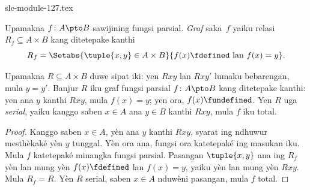 \begin{filecontents*}[overwrite]{slc-module-127.tex}
\begin{defn}
Upamakna $f\colon A \pto B$ sawijining fungsi parsial. \emph{Graf} saka~$f$
yaiku relasi $R_f \subseteq A \times B$ kang ditetepake kanthi
\[
R_f = \Setabs{\tuple{x,y} \in A \times B}{f(x) \fdefined \text{ lan } f(x) = y}.
\]
\end{defn}

\begin{prop}
Upamakna $R \subseteq A \times B$ duwe sipat iki: yen $Rxy$
lan $Rxy'$ lumaku bebarengan, mula $y = y'$. Banjur $R$ iku graf fungsi parsial
$f\colon A \pto B$ kang ditetepake kanthi: yen ana $y$ kanthi
$Rxy$, mula $f(x) = y$; yen ora, $f(x) \fundefined$. Yen $R$ uga
\emph{serial}, yaiku kanggo saben $x \in A$ ana $y \in B$ kanthi
$Rxy$, mula $f$ iku total.
\end{prop}

\begin{proof}
Kanggo saben $x \in A$, yèn ana $y$ kanthi $Rxy$, syarat ing ndhuwur
mesthèkaké yèn $y$ tunggal. Yèn ora ana, fungsi ora katetepaké ing masukan iku.
Mula $f$ katetepaké minangka fungsi parsial. Pasangan $\tuple{x,y}$ ana ing $R_f$ yèn lan mung yèn $f(x) \fdefined$ lan $f(x)=y$,
yaiku yèn lan mung yèn $Rxy$. Mula $R_f = R$.
Yèn $R$ serial, saben $x \in A$ nduwèni pasangan, mula $f$ total.
\end{proof}


\end{filecontents*}

